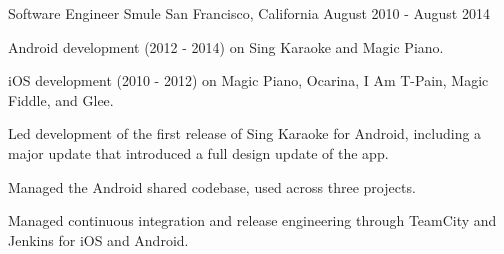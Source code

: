 \begin{cventries}
  \cventry
    {Software Engineer} %
    {Smule} %
    {San Francisco, California} %
    {August 2010 - August 2014} %
    {
      \begin{cvitems} %
        \item {Android development (2012 - 2014) on Sing Karaoke and Magic Piano.}
        \item {iOS development (2010 - 2012) on Magic Piano, Ocarina, I Am T-Pain, Magic Fiddle, and Glee.}
        \item {Led development of the first release of Sing Karaoke for Android, including a major update that introduced a full design update of the app.}
        \item {Managed the Android shared codebase, used across three projects.}
        \item {Managed continuous integration and release engineering through TeamCity and Jenkins for iOS and Android.}
      \end{cvitems}
    }
    

\end{cventries}

